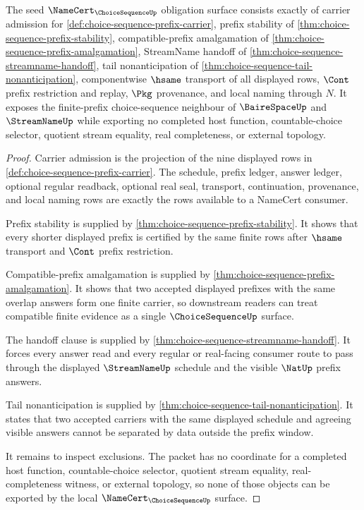 \begin{theorem}
\label{thm:choice-sequence-namecert-obligation-surface}
The seed $\NameCert_{\ChoiceSequenceUp}$ obligation surface consists exactly of carrier admission for \autoref{def:choice-sequence-prefix-carrier}, prefix stability of \autoref{thm:choice-sequence-prefix-stability}, compatible-prefix amalgamation of \autoref{thm:choice-sequence-prefix-amalgamation}, StreamName handoff of \autoref{thm:choice-sequence-streamname-handoff}, tail nonanticipation of \autoref{thm:choice-sequence-tail-nonanticipation}, componentwise $\hsame$ transport of all displayed rows, $\Cont$ prefix restriction and replay, $\Pkg$ provenance, and local naming through $N$. It exposes the finite-prefix choice-sequence neighbour of $\BaireSpaceUp$ and $\StreamNameUp$ while exporting no completed host function, countable-choice selector, quotient stream equality, real completeness, or external topology.
\end{theorem}
\begin{proof}
Carrier admission is the projection of the nine displayed rows in \autoref{def:choice-sequence-prefix-carrier}. The schedule, prefix ledger, answer ledger, optional regular readback, optional real seal, transport, continuation, provenance, and local naming rows are exactly the rows available to a NameCert consumer.

Prefix stability is supplied by \autoref{thm:choice-sequence-prefix-stability}. It shows that every shorter displayed prefix is certified by the same finite rows after $\hsame$ transport and $\Cont$ prefix restriction.

Compatible-prefix amalgamation is supplied by \autoref{thm:choice-sequence-prefix-amalgamation}. It shows that two accepted displayed prefixes with the same overlap answers form one finite carrier, so downstream readers can treat compatible finite evidence as a single $\ChoiceSequenceUp$ surface.

The handoff clause is supplied by \autoref{thm:choice-sequence-streamname-handoff}. It forces every answer read and every regular or real-facing consumer route to pass through the displayed $\StreamNameUp$ schedule and the visible $\NatUp$ prefix answers.

Tail nonanticipation is supplied by \autoref{thm:choice-sequence-tail-nonanticipation}. It states that two accepted carriers with the same displayed schedule and agreeing visible answers cannot be separated by data outside the prefix window.

It remains to inspect exclusions. The packet has no coordinate for a completed host function, countable-choice selector, quotient stream equality, real-completeness witness, or external topology, so none of those objects can be exported by the local $\NameCert_{\ChoiceSequenceUp}$ surface.
\end{proof}

